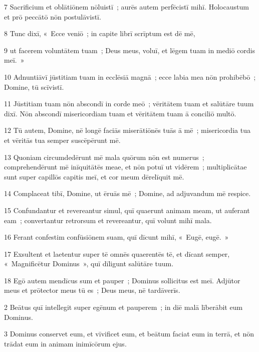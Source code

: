 \psalmVerse
  {\phantom{00}7}
  {Sacrificium et oblātiōnem nōluistī~; aurēs autem perfēcistī mihī. Holocaustum et prō peccātō nōn postulāvistī.}


\psalmVerse
  {\phantom{00}8}
  {Tunc dixī, «~Ecce veniō~; in capite librī scrīptum est dē mē,}


\psalmVerse
  {\phantom{00}9}
  {ut facerem voluntātem tuam~; Deus meus, voluī, et lēgem tuam in mediō cordis meī.~»}


\psalmVerse
  {\phantom{0}10}
  {Adnuntiāvī jūstitiam tuam in ecclēsiā magnā~; ecce labia mea nōn prohibēbō~; Domine, tū scīvistī.}


\psalmVerse
  {\phantom{0}11}
  {Jūstitiam tuam nōn abscondī in corde meō~; vēritātem tuam et salūtāre tuum dixī. Nōn abscondī misericordiam tuam et vēritātem tuam ā conciliō multō.}


\psalmVerse
  {\phantom{0}12}
  {Tū autem, Domine, nē longē faciās miserātiōnēs tuās ā mē~; misericordia tua et vēritās tua semper suscēpērunt mē.}


\psalmVerse
  {\phantom{0}13}
  {Quoniam circumdedērunt mē mala quōrum nōn est numerus~; comprehendērunt mē inīquitātēs meae, et nōn potuī ut vidērem~; multiplicātae sunt super capillōs capitis meī, et cor meum dērelīquit mē.}


\psalmVerse
  {\phantom{0}14}
  {Complaceat tibī, Domine, ut ēruās mē~; Domine, ad adjuvandum mē respice.}


\psalmVerse
  {\phantom{0}15}
  {Confundantur et revereantur simul, quī quaerunt animam meam, ut auferant eam~; convertantur retrorsum et revereantur, quī volunt mihī mala.}


\psalmVerse
  {\phantom{0}16}
  {Ferant confestim confūsiōnem suam, quī dīcunt mihī, «~Eugē, eugē.~»}


\psalmVerse
  {\phantom{0}17}
  {Exsultent et laetentur super tē omnēs quaerentēs tē, et dīcant semper, «~Magnificētur Dominus~», quī dīligunt salūtāre tuum.}


\psalmVerse
  {\phantom{0}18}
  {Egō autem mendīcus sum et pauper~; Dominus sollicitus est meī. Adjūtor meus et prōtector meus tū es~; Deus meus, nē tardāverīs.}




\psalmVerse
  {\phantom{00}2}
  {Beātus quī intellegit super egēnum et pauperem~; in diē malā līberābit eum Dominus.}


\psalmVerse
  {\phantom{00}3}
  {Dominus conservet eum, et vīvificet eum, et beātum faciat eum in terrā, et nōn trādat eum in animam inimīcōrum ejus.}


